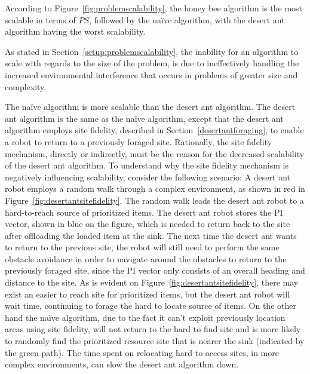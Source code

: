 According to Figure~\ref{fig:problemscalability}, the honey bee algorithm is the most scalable in terms of $PS$, followed by the na\"ive algorithm, with the desert ant algorithm having the worst scalability. %

As stated in Section~\ref{setup:problemscalability}, the inability for an algorithm to scale with regards to the size of the problem, is due to ineffectively handling the increased environmental interference that occurs in problems of greater size and complexity.

The na\"ive algorithm is more scalable than the desert ant algorithm. The desert ant algorithm is the same as the na\"ive algorithm, except that the desert ant algorithm employs site fidelity, described in Section~\ref{desertantforaging}, to enable a robot to return to a previously foraged site. Rationally, the site fidelity mechanism, directly or indirectly, must be the reason for the decreased scalability of the desert ant algorithm. To understand why the site fidelity mechanism is negatively influencing scalability, consider the following scenario: A desert ant robot employs a random walk through a complex environment, as shown in red in Figure~\ref{fig:desertantsitefidelity}. The random walk leads the desert ant robot to a hard-to-reach source of prioritized items. The desert ant robot stores the PI vector, shown in blue on the figure, which is needed to return back to the site after offloading the loaded item at the sink. The next time the desert ant wants to return to the previous site, the robot will still need to perform the same obstacle avoidance in order to navigate around the obstacles to return to the previously foraged site, since the PI vector only consists of an overall heading and distance to the site. As is evident on Figure~\ref{fig:desertantsitefidelity}, there may exist an easier to reach site for prioritized items, but the desert ant robot will wait time, continuing to forage the hard to locate source of items. On the other hand the na\"ive algorithm, due to the fact it can't exploit previously location areas using site fidelity, will not return to the hard to find site and is more likely to randomly find the prioritized resource site that is nearer the sink (indicated by the green path). The time spent on relocating hard to access sites, in more complex environments, can slow the desert ant algorithm down.

